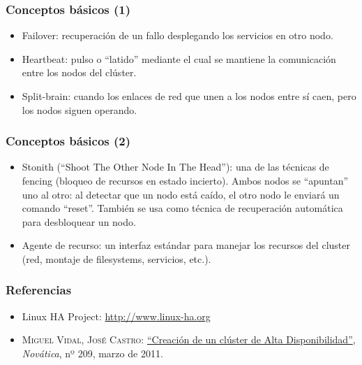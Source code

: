 \documentclass{beamer}
\begin{document}

\begin{frame}
\frametitle{Conceptos básicos (1)}

\begin{itemize}
\item \alert{Failover}: recuperación de un fallo desplegando los servicios en otro nodo.
\item \alert{Heartbeat}: pulso o ``latido'' mediante el cual se mantiene la comunicación entre los nodos del clúster. 
\item \alert{Split-brain}: cuando los enlaces de red que unen a los nodos entre sí caen, pero los nodos siguen operando. 
\end{itemize}

\end{frame}


\begin{frame}
\frametitle{Conceptos básicos (2)}

\begin{itemize}
\item \alert{Stonith} (``Shoot The Other Node In The Head''): una de las técnicas de \alert{fencing} (bloqueo de recursos en estado incierto). Ambos nodos se ``apuntan'' uno al otro: al detectar que un nodo está caído, el otro nodo le enviará un comando ``reset''. También se usa como técnica de recuperación automática para desbloquear un nodo.
\item \alert{Agente de recurso}: un interfaz estándar para manejar los recursos del cluster (red, montaje de filesystems, servicios, etc.). 
\end{itemize}

\end{frame}



\begin{frame}
\frametitle{Referencias}

\begin{itemize}
\item Linux HA Project: \href{http://www.linux-ha.org}{http://www.linux-ha.org}
\item \textsc{Miguel Vidal, José Castro}: \href{http://www.ati.es/novatica/2011/209/Nv209-75.pdf}{``Creación de un clúster de Alta Disponibilidad''}, \textit{Novática}, nº 209, marzo de 2011. 
\end{itemize}

\end{frame}






\end{document}
